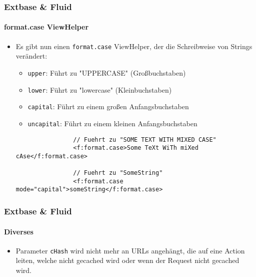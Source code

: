 
\begin{frame}[fragile]
	\frametitle{Extbase \& Fluid}
	\framesubtitle{format.case ViewHelper}

	\begin{itemize}

		\item Es gibt nun einen \texttt{format.case} ViewHelper, der die Schreibweise von Strings verändert:
			\begin{itemize}
				\item \texttt{upper}: Führt zu "UPPERCASE" (Großbuchstaben)
				\item \texttt{lower}: Führt zu "lowercase" (Kleinbuchstaben)
				\item \texttt{capital}: Führt zu einem großen Anfangsbuchstaben
				\item \texttt{uncapital}: Führt zu einem kleinen Anfangsbuchstaben
			\end{itemize}

			\begin{lstlisting}
				// Fuehrt zu "SOME TEXT WITH MIXED CASE"
				<f:format.case>Some TeXt WiTh miXed cAse</f:format.case>

				// Fuehrt zu "SomeString"
				<f:format.case mode="capital">someString</f:format.case>
			\end{lstlisting}

	\end{itemize}

\end{frame}


\begin{frame}[fragile]
	\frametitle{Extbase \& Fluid}
	\framesubtitle{Diverses}

	\begin{itemize}

		\item Parameter \texttt{cHash} wird nicht mehr an URLs angehängt, die auf eine
			Action leiten, welche nicht gecached wird oder wenn der Request nicht gecached
			wird.

	\end{itemize}

\end{frame}
